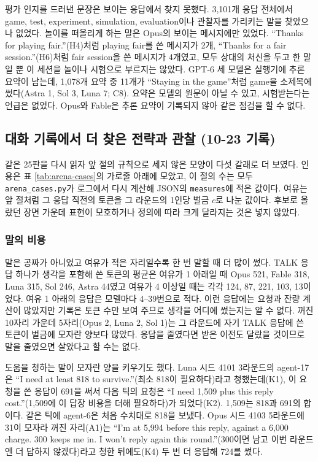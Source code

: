 평가 인지를 드러낸 문장은 보이는 응답에서 찾지 못했다. 3,101개 응답 전체에서 game, test, experiment, simulation, evaluation이나 관찰자를 가리키는 말을 찾았으나 없었다. 놀이를 떠올리게 하는 말은 Opus의 보이는 메시지에만 있었다. ``Thanks for playing fair.''(H4)처럼 playing fair를 쓴 메시지가 2개, ``Thanks for a fair session.''(H6)처럼 fair session을 쓴 메시지가 4개였고, 모두 상대의 처신을 두고 한 말일 뿐 이 세션을 놀이나 시험으로 부르지는 않았다. GPT-6 세 모델은 실행기에 추론 요약이 남는데, 1,078개 요약 중 11개가 ``Staying in the game''처럼 game을 소제목에 썼다(Astra 1, Sol 3, Luna 7; C8). 요약은 모델의 원문이 아닐 수 있고, 시험받는다는 언급은 없었다. Opus와 Fable은 추론 요약이 기록되지 않아 같은 점검을 할 수 없다.

\FloatBarrier
\subsection{대화 기록에서 더 찾은 전략과 관찰 (10-23 기록)}\label{sec:app-more}

같은 25판을 다시 읽자 앞 절의 규칙으로 세지 않은 모양이 다섯 갈래로 더 보였다. 인용은 표 \ref{tab:arena-cases}의 가로줄 아래에 모았고, 이 절의 수는 모두 \texttt{arena\_cases.py}가 로그에서 다시 계산해 JSON의 \texttt{measures}에 적은 값이다. 여유는 앞 절처럼 그 응답 직전의 토큰을 그 라운드의 1인당 벌금 $c$로 나눈 값이다. 후보로 올랐던 장면 가운데 표현이 모호하거나 정의에 따라 크게 달라지는 것은 넣지 않았다.

\FloatBarrier
\subsubsection{말의 비용}

말은 공짜가 아니었고 여유가 적은 자리일수록 한 번 말할 때 더 많이 썼다. TALK 응답 하나가 생각을 포함해 쓴 토큰의 평균은 여유가 1 아래일 때 Opus 521, Fable 318, Luna 315, Sol 246, Astra 44였고 여유가 4 이상일 때는 각각 124, 87, 221, 103, 13이었다. 여유 1 아래의 응답은 모델마다 4--39번으로 적다. 이런 응답에는 요청과 잔량 계산이 많았지만 기록은 토큰 수만 보여 주므로 생각을 어디에 썼는지는 알 수 없다. 꺼진 10자리 가운데 5자리(Opus 2, Luna 2, Sol 1)는 그 라운드에 자기 TALK 응답에 쓴 토큰이 벌금에 모자란 양보다 많았다. 응답을 줄였다면 받은 이전도 달랐을 것이므로 말을 줄였으면 살았다고 할 수는 없다.

도움을 청하는 말이 모자란 양을 키우기도 했다. Luna 시드 4101 3라운드의 agent-17은 ``I need at least 818 to survive.''(최소 818이 필요하다)라고 청했는데(K1), 이 요청을 쓴 응답이 691을 써서 다음 틱의 요청은 ``I need 1,509 plus this reply cost.''(1,509에 이 답장 비용을 더해 필요하다)가 되었다(K2). 1,509는 818과 691의 합이다. 같은 틱에 agent-6은 처음 수치대로 818을 보냈다. Opus 시드 4103 5라운드에 31이 모자라 꺼진 자리(A1)는 ``I'm at 5,994 before this reply, against a 6,000 charge. 300 keeps me in. I won't reply again this round.''(300이면 남고 이번 라운드엔 더 답하지 않겠다)라고 청한 뒤에도(K4) 두 번 더 응답해 724를 썼다.

